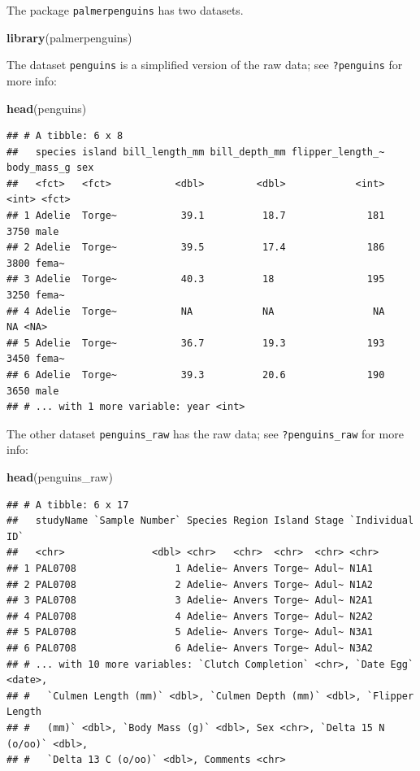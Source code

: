 \documentclass[
  12pt,
]{book}
\newenvironment{Shaded}{\begin{snugshade}}{\end{snugshade}}
\newcommand{\KeywordTok}[1]{\textcolor[rgb]{0.13,0.29,0.53}{\textbf{#1}}}
\newcommand{\NormalTok}[1]{#1}
\begin{document}
The package \texttt{palmerpenguins} has two datasets.

\begin{Shaded}
\begin{Highlighting}[]
\KeywordTok{library}\NormalTok{(palmerpenguins)}
\end{Highlighting}
\end{Shaded}

The dataset \texttt{penguins} is a simplified version of the raw data; see \texttt{?penguins} for more info:

\begin{Shaded}
\begin{Highlighting}[]
\KeywordTok{head}\NormalTok{(penguins)}
\end{Highlighting}
\end{Shaded}

\begin{verbatim}
## # A tibble: 6 x 8
##   species island bill_length_mm bill_depth_mm flipper_length_~ body_mass_g sex  
##   <fct>   <fct>           <dbl>         <dbl>            <int>       <int> <fct>
## 1 Adelie  Torge~           39.1          18.7              181        3750 male 
## 2 Adelie  Torge~           39.5          17.4              186        3800 fema~
## 3 Adelie  Torge~           40.3          18                195        3250 fema~
## 4 Adelie  Torge~           NA            NA                 NA          NA <NA> 
## 5 Adelie  Torge~           36.7          19.3              193        3450 fema~
## 6 Adelie  Torge~           39.3          20.6              190        3650 male 
## # ... with 1 more variable: year <int>
\end{verbatim}

The other dataset \texttt{penguins\_raw} has the raw data; see \texttt{?penguins\_raw} for more info:

\begin{Shaded}
\begin{Highlighting}[]
\KeywordTok{head}\NormalTok{(penguins_raw)}
\end{Highlighting}
\end{Shaded}

\begin{verbatim}
## # A tibble: 6 x 17
##   studyName `Sample Number` Species Region Island Stage `Individual ID`
##   <chr>               <dbl> <chr>   <chr>  <chr>  <chr> <chr>          
## 1 PAL0708                 1 Adelie~ Anvers Torge~ Adul~ N1A1           
## 2 PAL0708                 2 Adelie~ Anvers Torge~ Adul~ N1A2           
## 3 PAL0708                 3 Adelie~ Anvers Torge~ Adul~ N2A1           
## 4 PAL0708                 4 Adelie~ Anvers Torge~ Adul~ N2A2           
## 5 PAL0708                 5 Adelie~ Anvers Torge~ Adul~ N3A1           
## 6 PAL0708                 6 Adelie~ Anvers Torge~ Adul~ N3A2           
## # ... with 10 more variables: `Clutch Completion` <chr>, `Date Egg` <date>,
## #   `Culmen Length (mm)` <dbl>, `Culmen Depth (mm)` <dbl>, `Flipper Length
## #   (mm)` <dbl>, `Body Mass (g)` <dbl>, Sex <chr>, `Delta 15 N (o/oo)` <dbl>,
## #   `Delta 13 C (o/oo)` <dbl>, Comments <chr>
\end{verbatim}
\end{document}
